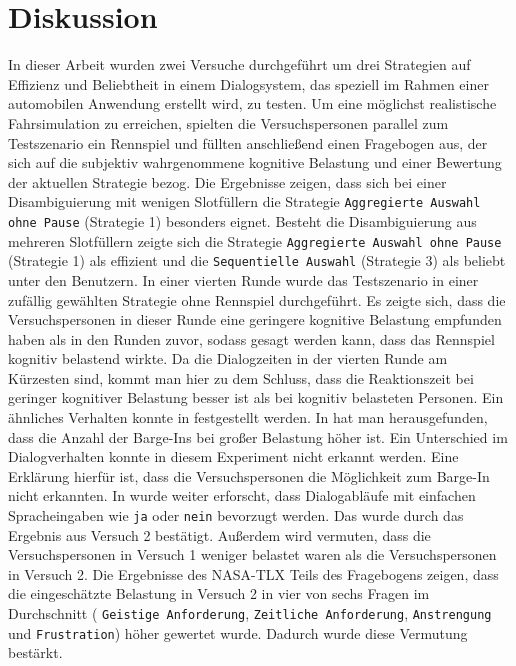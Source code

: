 \documentclass[12pt,a4paper]{scrartcl}
\begin{document}
\section{Diskussion}
\label{discussion}
In dieser Arbeit wurden zwei Versuche durchgeführt um drei Strategien auf Effizienz und Beliebtheit in einem Dialogsystem, das speziell im Rahmen einer automobilen Anwendung erstellt wird, zu testen. Um eine möglichst realistische Fahrsimulation zu erreichen, spielten die Versuchspersonen parallel zum Testszenario ein Rennspiel und füllten anschließend einen Fragebogen aus, der sich auf die subjektiv wahrgenommene kognitive Belastung und einer Bewertung der aktuellen Strategie bezog.
Die Ergebnisse zeigen, dass sich bei einer Disambiguierung mit wenigen Slotfüllern die Strategie \texttt{Aggregierte Auswahl ohne Pause} (Strategie 1) besonders eignet. Besteht die Disambiguierung aus mehreren Slotfüllern zeigte sich die Strategie \texttt{Aggregierte Auswahl ohne Pause} (Strategie 1) als effizient und die \texttt{Sequentielle Auswahl} (Strategie 3) als beliebt unter den Benutzern. \newline \newline
In einer vierten Runde wurde das Testszenario in einer zufällig gewählten Strategie ohne Rennspiel durchgeführt. Es zeigte sich, dass die Versuchspersonen in dieser Runde eine geringere kognitive Belastung empfunden haben als in den Runden zuvor, sodass gesagt werden kann, dass das Rennspiel kognitiv belastend wirkte. Da die Dialogzeiten in der vierten Runde am Kürzesten sind, kommt man hier zu dem Schluss, dass die Reaktionszeit bei geringer kognitiver Belastung besser ist als bei kognitiv belasteten Personen. Ein ähnliches Verhalten konnte in \cite{DbCL} festgestellt werden. In \cite{eCLDS} hat man herausgefunden, dass die Anzahl der Barge-Ins bei großer Belastung höher ist. Ein Unterschied im Dialogverhalten konnte in diesem Experiment nicht erkannt werden. Eine Erklärung hierfür ist, dass die Versuchspersonen die Möglichkeit zum Barge-In nicht erkannten. In \cite{eCLDS} wurde weiter erforscht, dass Dialogabläufe mit einfachen Spracheingaben wie \texttt{ja} oder \texttt{nein} bevorzugt werden. Das wurde durch das Ergebnis aus Versuch 2 bestätigt. Außerdem wird vermuten, dass die Versuchspersonen in Versuch 1 weniger belastet waren als die Versuchspersonen in Versuch 2. Die Ergebnisse des NASA-TLX Teils des Fragebogens zeigen, dass die eingeschätzte Belastung in Versuch 2 in vier von sechs Fragen im Durchschnitt ( \texttt{Geistige Anforderung}, \texttt{Zeitliche Anforderung}, \texttt{Anstrengung} und \texttt{Frustration}) höher gewertet wurde. Dadurch wurde diese Vermutung bestärkt. \newline \newline
\end{document}
